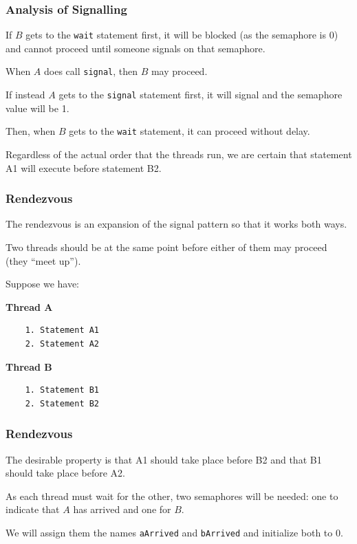 \begin{frame}
\frametitle{Analysis of Signalling}

If $B$ gets to the \texttt{wait} statement first, it will be blocked (as the semaphore is 0) and cannot proceed until someone signals on that semaphore. 

When $A$ does call \texttt{signal}, then $B$ may proceed. 

If instead $A$ gets to the \texttt{signal} statement first, it will signal and the semaphore value will be 1. 

Then, when $B$ gets to the \texttt{wait} statement, it can proceed without delay.

Regardless of the actual order that the threads run, we are certain that statement A1 will execute before statement B2.

\end{frame}

\begin{frame}[fragile]
\frametitle{Rendezvous}

The rendezvous is an expansion of the signal pattern so that it works both ways.

Two threads should be at the same point before either of them may proceed (they ``meet up'').

Suppose we have:

\begin{multicols}{2}
\textbf{Thread A}
  \begin{verbatim}
	1. Statement A1
	2. Statement A2
  \end{verbatim}
\columnbreak
\textbf{Thread B}
  \begin{verbatim}
	1. Statement B1
	2. Statement B2
  \end{verbatim}
\end{multicols}
\vspace{-2em}



\end{frame}

\begin{frame}
\frametitle{Rendezvous}

The desirable property is that A1 should take place before B2 and that B1 should take place before A2. 

As each thread must wait for the other, two semaphores will be needed: one to indicate that $A$ has arrived and one for $B$. 

We will assign them the names \texttt{aArrived} and \texttt{bArrived} and initialize both to 0. 

\end{frame}

